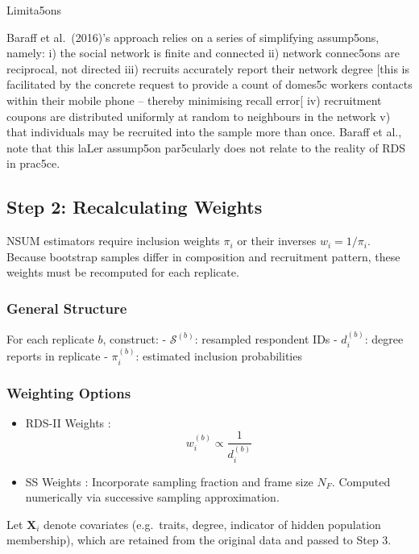 \documentclass[
  12pt,
  letterpaper,
  DIV=11,
  numbers=noendperiod]{scrartcl}
\theoremstyle{plain}
\theoremstyle{definition}
\begin{document}
Limita5ons

Baraﬀ et al.~(2016)'s approach relies on a series of simplifying
assump5ons, namely: i) the social network is finite and connected ii)
network connec5ons are reciprocal, not directed iii) recruits accurately
report their network degree {[}this is facilitated by the concrete
request to provide a count of domes5c workers contacts within their
mobile phone -- thereby minimising recall error{[} iv) recruitment
coupons are distributed uniformly at random to neighbours in the network
v) that individuals may be recruited into the sample more than once.
Baraﬀ et al., note that this laLer assump5on par5cularly does not relate
to the reality of RDS in prac5ce.

\subsection{Step 2: Recalculating
Weights}\label{step-2-recalculating-weights}

NSUM estimators require inclusion weights \(\pi_i\) or their inverses
\(w_i = 1 / \pi_i\). Because bootstrap samples differ in composition and
recruitment pattern, these weights must be recomputed for each
replicate.

\subsubsection{General Structure}\label{general-structure}

For each replicate \(b\), construct: - \(\mathcal{S}^{(b)}\): resampled
respondent IDs - \(d_i^{(b)}\): degree reports in replicate -
\(\pi_i^{(b)}\): estimated inclusion probabilities

\subsubsection{Weighting Options}\label{weighting-options}

\begin{itemize}
\item
  RDS-II Weights \autocite{volz08-probability}: \[
  w_i^{(b)} \propto \frac{1}{d_i^{(b)}}
  \]
\item
  SS Weights \autocite{gile11-improved}: Incorporate sampling fraction
  and frame size \(N_F\). Computed numerically via successive sampling
  approximation.
\end{itemize}

Let \(\mathbf{X}_i\) denote covariates (e.g.~traits, degree, indicator
of hidden population membership), which are retained from the original
data and passed to Step 3.
\end{document}
